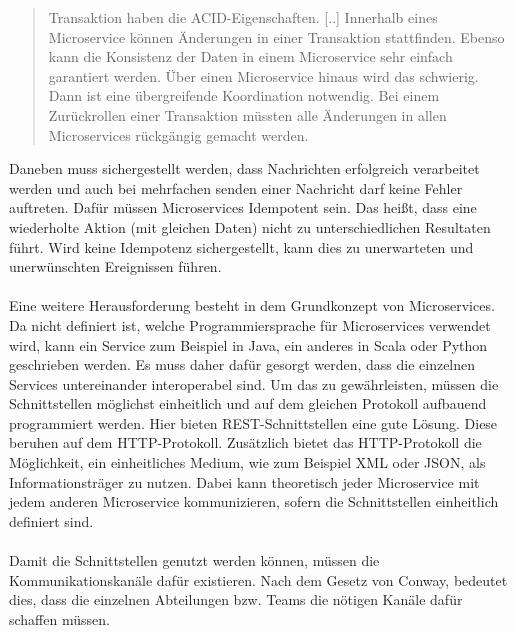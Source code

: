 \begin{quotation}
    \frqq Transaktion haben die ACID-Eigenschaften. [..] Innerhalb eines Microservice können Änderungen in einer Transaktion stattfinden. Ebenso kann die Konsistenz der Daten in einem Microservice sehr einfach garantiert werden. Über einen Microservice hinaus wird das schwierig. Dann ist eine übergreifende Koordination notwendig. Bei einem Zurückrollen einer Transaktion müssten alle Änderungen in allen Microservices rückgängig gemacht werden.\flqq\ \cite[S. 35]{EWolff2016:Microservices}
\end{quotation}

Daneben muss sichergestellt werden, dass Nachrichten erfolgreich verarbeitet werden und auch bei mehrfachen senden einer Nachricht darf keine Fehler auftreten. Dafür müssen Microservices Idempotent sein. Das heißt, dass eine wiederholte Aktion (mit gleichen Daten) nicht zu unterschiedlichen Resultaten führt. Wird keine Idempotenz sichergestellt, kann dies zu unerwarteten und unerwünschten Ereignissen führen.
\\\\
Eine weitere Herausforderung besteht in dem Grundkonzept von Microservices. Da nicht definiert ist, welche Programmiersprache für Microservices verwendet wird, kann ein Service zum Beispiel in Java, ein anderes in Scala oder Python geschrieben werden. Es muss daher dafür gesorgt werden, dass die einzelnen Services untereinander interoperabel sind. Um das zu gewährleisten, müssen die Schnittstellen möglichst einheitlich und auf dem gleichen Protokoll aufbauend programmiert werden. Hier bieten REST-Schnittstellen eine gute Lösung. Diese beruhen auf dem HTTP-Protokoll. Zusätzlich bietet das HTTP-Protokoll die Möglichkeit, ein einheitliches Medium, wie zum Beispiel XML oder JSON, als Informationsträger zu nutzen. Dabei kann theoretisch jeder Microservice mit jedem anderen Microservice kommunizieren, sofern die Schnittstellen einheitlich definiert sind.
\\\\
Damit die Schnittstellen genutzt werden können, müssen die Kommunikationskanäle dafür existieren. Nach dem Gesetz von Conway, bedeutet dies, dass die einzelnen Abteilungen bzw. Teams die nötigen Kanäle dafür schaffen müssen.

